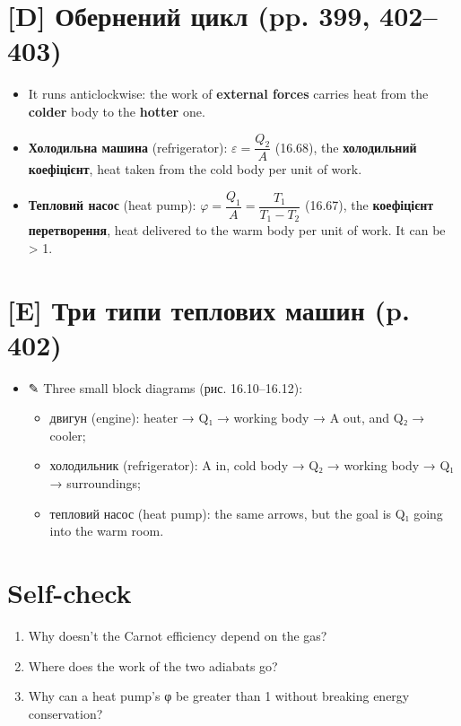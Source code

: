 \documentclass[11pt,a4paper,oneside]{book}
\newcommand{\pen}{{\sffamily\color{accent}✎}}
\begin{document}
\section*{[D] Обернений цикл (pp. 399, 402–403)}
\begin{itemize}
\item It runs anticlockwise: the work of \textbf{external forces} carries heat from the \textbf{colder} body to the \textbf{hotter} one.
\item \textbf{Холодильна машина} (refrigerator): $\varepsilon = \dfrac{Q_2}{A}$ (16.68), the \textbf{холодильний коефіцієнт}, heat taken from the cold body per unit of work.
\item \textbf{Тепловий насос} (heat pump): $\varphi = \dfrac{Q_1}{A} = \dfrac{T_1}{T_1 - T_2}$ (16.67), the \textbf{коефіцієнт перетворення}, heat delivered to the warm body per unit of work. It can be > 1.
\end{itemize}

\section*{[E] Три типи теплових машин (p. 402)}
\begin{itemize}
\item \pen{} Three small block diagrams (рис. 16.10–16.12):
\begin{itemize}
\item двигун (engine): heater → Q₁ → working body → A out, and Q₂ → cooler;
\item холодильник (refrigerator): A in, cold body → Q₂ → working body → Q₁ → surroundings;
\item тепловий насос (heat pump): the same arrows, but the goal is Q₁ going into the warm room.
\end{itemize}
\end{itemize}

\section*{Self-check}
\begin{enumerate}
\item Why doesn't the Carnot efficiency depend on the gas?
\item Where does the work of the two adiabats go?
\item Why can a heat pump's φ be greater than 1 without breaking energy conservation?
\end{enumerate}
\end{document}
